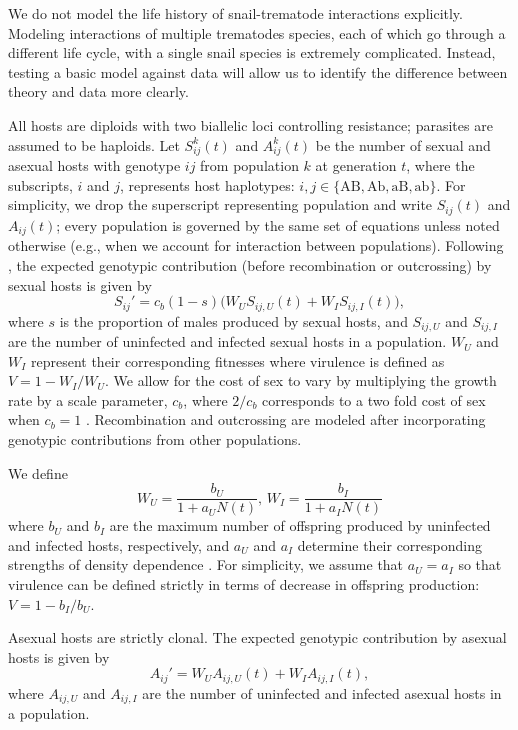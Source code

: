 \documentclass{article}\usepackage[]{graphicx}\usepackage[]{color}
\begin{document}
We do not model the life history of snail-trematode interactions explicitly.
Modeling interactions of multiple trematodes species, each of which go through a different life cycle, with a single snail species is extremely complicated.
Instead, testing a basic model against data will allow us to identify the difference between theory and data more clearly.

All hosts are diploids with two biallelic loci controlling resistance; parasites are assumed to be haploids.
Let $S_{ij}^k(t)$ and $A_{ij}^k(t)$ be the number of sexual and asexual hosts with genotype $ij$ from population $k$ at generation $t$, 
where the subscripts, $i$ and $j$, represents host haplotypes: $i, j \in \{\mathrm{AB}, \mathrm{Ab}, \mathrm{aB}, \mathrm{ab}\}$.
For simplicity, we drop the superscript representing population and write $S_{ij}(t)$ and $A_{ij}(t)$;
every population is governed by the same set of equations unless noted otherwise (e.g., when we account for interaction between populations).
Following \cite{lively2010epidemiological}, the expected genotypic contribution (before recombination or outcrossing) by sexual hosts is given by
\begin{equation}
S_{ij}' = c_b (1-s) \bigg(W_U S_{ij,U} (t) + W_I S_{ij,I} (t)\bigg),
\end{equation}
where $s$ is the proportion of males produced by sexual hosts, and $S_{ij, U}$ and $S_{ij,I}$ are the number of uninfected and infected sexual hosts in a population.
$W_U$ and $W_I$ represent their corresponding fitnesses where virulence is defined as $V = 1-W_I/W_U$.
We allow for the cost of sex to vary by multiplying the growth rate by a scale parameter, $c_b$, where $2/c_b$ corresponds to a two fold cost of sex when $c_b = 1$ \citep{ashby2015diversity}.
Recombination and outcrossing are modeled after incorporating genotypic contributions from other populations.

We define
$$
W_U = \frac{b_U}{1 + a_U N(t)},\,  W_I = \frac{b_I}{1 + a_I N(t)}
$$
where $b_U$ and $b_I$ are the maximum number of offspring produced by uninfected and infected hosts, respectively, and $a_U$ and $a_I$ determine their corresponding strengths of density dependence \citep{smith1973stability, lively2010epidemiological}.
For simplicity, we assume that $a_U = a_I$ so that virulence can be defined strictly in terms of decrease in offspring production: $V = 1- b_I/b_U$.

Asexual hosts are strictly clonal.
The expected genotypic contribution by asexual hosts is given by
\begin{equation}
A_{ij}' = W_U A_{ij,U} (t) + W_I A_{ij,I} (t),
\end{equation}
where $A_{ij, U}$ and $A_{ij,I}$ are the number of uninfected and infected asexual hosts in a population.
\end{document}
